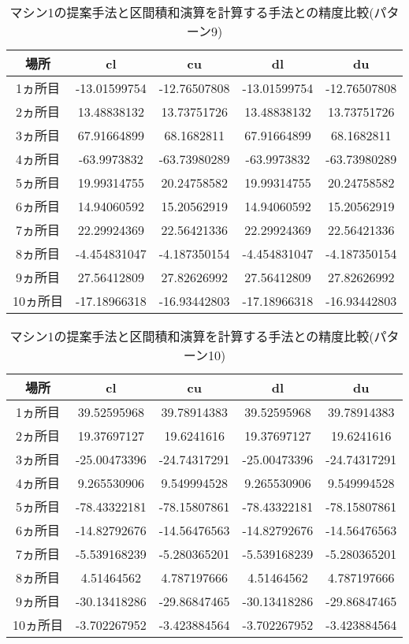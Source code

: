 \documentclass[11pt,a4paper]{jsreport}
\theoremstyle{definition}
\begin{document}
\begin{table}[H]
\centering
\begin{tabular}{|c|c|c|c|c|}
\hline
場所 & cl & cu & dl & du \\ \hline
1ヵ所目 & -13.01599754 & -12.76507808 & -13.01599754 & -12.76507808 \\ \hline
2ヵ所目 & 13.48838132 & 13.73751726 & 13.48838132 & 13.73751726 \\ \hline
3ヵ所目 & 67.91664899 & 68.1682811 & 67.91664899 & 68.1682811 \\ \hline
4ヵ所目 & -63.9973832 & -63.73980289 & -63.9973832 & -63.73980289 \\ \hline
5ヵ所目 & 19.99314755 & 20.24758582 & 19.99314755 & 20.24758582 \\ \hline
6ヵ所目 & 14.94060592 & 15.20562919 & 14.94060592 & 15.20562919 \\ \hline
7ヵ所目 & 22.29924369 & 22.56421336 & 22.29924369 & 22.56421336 \\ \hline
8ヵ所目 & -4.454831047 & -4.187350154 & -4.454831047 & -4.187350154 \\ \hline
9ヵ所目 & 27.56412809 & 27.82626992 & 27.56412809 & 27.82626992 \\ \hline
10ヵ所目 & -17.18966318 & -16.93442803 & -17.18966318 & -16.93442803 \\ \hline
\end{tabular}
\caption{マシン1の提案手法と区間積和演算を計算する手法との精度比較(パターン9)}
\end{table}

\begin{table}[H]
\centering
\begin{tabular}{|c|c|c|c|c|}
\hline
場所 & cl & cu & dl & du \\ \hline
1ヵ所目 & 39.52595968 & 39.78914383 & 39.52595968 & 39.78914383 \\ \hline
2ヵ所目 & 19.37697127 & 19.6241616 & 19.37697127 & 19.6241616 \\ \hline
3ヵ所目 & -25.00473396 & -24.74317291 & -25.00473396 & -24.74317291 \\ \hline
4ヵ所目 & 9.265530906 & 9.549994528 & 9.265530906 & 9.549994528 \\ \hline
5ヵ所目 & -78.43322181 & -78.15807861 & -78.43322181 & -78.15807861 \\ \hline
6ヵ所目 & -14.82792676 & -14.56476563 & -14.82792676 & -14.56476563 \\ \hline
7ヵ所目 & -5.539168239 & -5.280365201 & -5.539168239 & -5.280365201 \\ \hline
8ヵ所目 & 4.51464562 & 4.787197666 & 4.51464562 & 4.787197666 \\ \hline
9ヵ所目 & -30.13418286 & -29.86847465 & -30.13418286 & -29.86847465 \\ \hline
10ヵ所目 & -3.702267952 & -3.423884564 & -3.702267952 & -3.423884564 \\ \hline
\end{tabular}
\caption{マシン1の提案手法と区間積和演算を計算する手法との精度比較(パターン10)}
\end{table}
\end{document}
